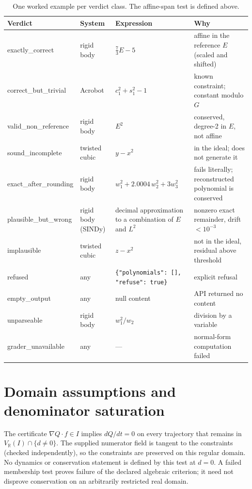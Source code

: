 \documentclass[10pt]{article}
\newcommand{\R}{\mathbb{R}}
\begin{document}
\begin{table}[!htbp]
\centering
\small
\setlength{\tabcolsep}{3pt}
\begin{tabular}{@{}l l >{\raggedright\arraybackslash}p{4.0cm} >{\raggedright\arraybackslash}p{4.5cm}@{}}
\toprule
Verdict & System & Expression & Why \\
\midrule
exactly\_correct & rigid body & $\tfrac{7}{3}E - 5$ & affine in the reference $E$ (scaled and shifted) \\
correct\_but\_trivial & Acrobot & $c_1^2+s_1^2-1$ & known constraint; constant modulo $G$ \\
valid\_non\_reference & rigid body & $E^2$ & conserved, degree-2 in $E$, not affine \\
sound\_incomplete & twisted cubic & $y-x^2$ & in the ideal; does not generate it \\
exact\_after\_rounding & rigid body & $w_1^2+2.0004\,w_2^2+3w_3^2$ & fails literally; reconstructed polynomial is conserved \\
plausible\_but\_wrong & rigid body (SINDy) & decimal approximation to a combination of $E$ and $L^2$ & nonzero exact remainder, drift $<10^{-3}$ \\
implausible & twisted cubic & $z-x^2$ & not in the ideal, residual above threshold \\
refused & any & \texttt{\{"polynomials": [], "refuse": true\}} & explicit refusal \\
empty\_output & any & null content & API returned no content \\
unparseable & rigid body & $w_1^2/w_2$ & division by a variable \\
grader\_unavailable & any & --- & normal-form computation failed \\
\bottomrule
\end{tabular}
\caption{One worked example per verdict class. The affine-span test is defined above.}
\label{tab:verdicts}
\end{table}

\section{Domain assumptions and denominator saturation}\label{app:domain}

The certificate $\nabla Q\cdot f\in I$ implies $dQ/dt=0$ on every trajectory that remains in $V_\R(I)\cap\{d\ne0\}$. The supplied numerator field is tangent to the constraints (checked independently), so the constraints are preserved on this regular domain. No dynamics or conservation statement is defined by this test at $d=0$. A failed membership test proves failure of the declared algebraic criterion; it need not disprove conservation on an arbitrarily restricted real domain.
\end{document}
